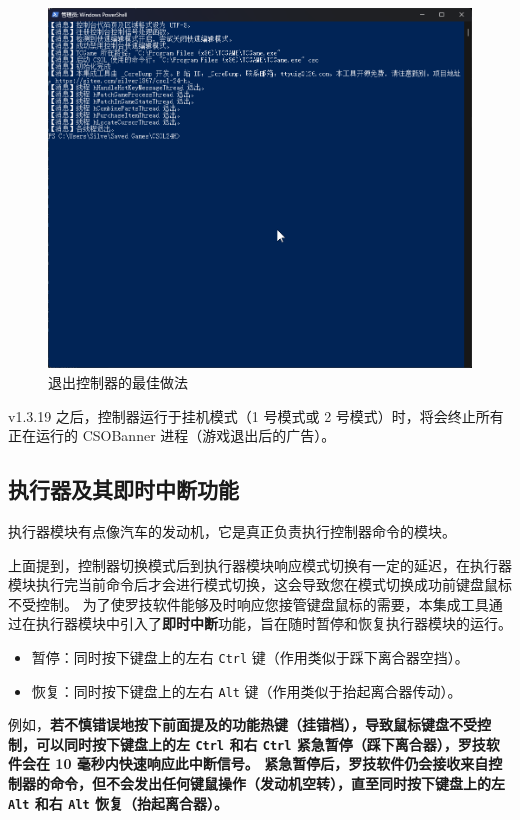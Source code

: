 \begin{figure}[H]
    \Centering
    \includegraphics[width=\textwidth]{assets/intro/exit_controller.png}
    \caption{退出控制器的最佳做法}
\end{figure}

v1.3.19 之后，控制器运行于挂机模式（1 号模式或 2 号模式）时，将会终止所有正在运行的 CSOBanner 进程（游戏退出后的广告）。

\subsection{执行器及其即时中断功能}

执行器模块有点像汽车的发动机，它是真正负责执行控制器命令的模块。

上面提到，控制器切换模式后到执行器模块响应模式切换有一定的延迟，在执行器模块执行完当前命令后才会进行模式切换，这会导致您在模式切换成功前键盘鼠标不受控制。
为了使罗技软件能够及时响应您接管键盘鼠标的需要，本集成工具通过在执行器模块中引入了\textbf{即时中断}功能，旨在随时暂停和恢复执行器模块的运行。

\begin{itemize}
\item 暂停：同时按下键盘上的左右 \lstinline{Ctrl} 键（作用类似于踩下离合器空挡）。
\item 恢复：同时按下键盘上的左右 \lstinline{Alt} 键（作用类似于抬起离合器传动）。
\end{itemize}

例如，\textbf{\color{red}若不慎错误地按下前面提及的功能热键（挂错档），导致鼠标键盘不受控制，可以同时按下键盘上的左 \lstinline{Ctrl} 和右 \lstinline{Ctrl} 紧急暂停（踩下离合器），罗技软件会在 10 毫秒内快速响应此中断信号。
紧急暂停后，罗技软件仍会接收来自控制器的命令，但不会发出任何键鼠操作（发动机空转），直至同时按下键盘上的左 \lstinline{Alt} 和右 \lstinline{Alt} 恢复（抬起离合器）。}

